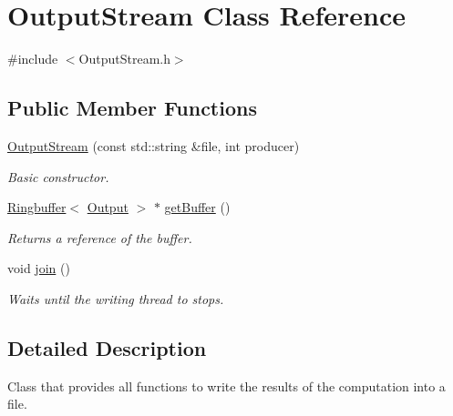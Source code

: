 \hypertarget{classOutputStream}{\section{Output\-Stream Class Reference}
\label{classOutputStream}
}


{\ttfamily \#include $<$Output\-Stream.\-h$>$}

\subsection*{Public Member Functions}
\begin{DoxyCompactItemize}
\item 
\hyperlink{classOutputStream_ab581ff3d5e6cbc31c5f84eea52c298e1}{Output\-Stream} (const std\-::string \&file, int producer)
\begin{DoxyCompactList}\small\item\em Basic constructor. \end{DoxyCompactList}\item 
\hypertarget{classOutputStream_a0e0bc9c5542c5e56e7b331e19c31890d}{\hyperlink{classRingbuffer}{Ringbuffer}$<$ \hyperlink{structfitData}{Output} $>$ $\ast$ \hyperlink{classOutputStream_a0e0bc9c5542c5e56e7b331e19c31890d}{get\-Buffer} ()}\label{classOutputStream_a0e0bc9c5542c5e56e7b331e19c31890d}

\begin{DoxyCompactList}\small\item\em Returns a reference of the buffer. \end{DoxyCompactList}\item 
\hypertarget{classOutputStream_ae8481e9bef46ca1522da5312c32d4bba}{void \hyperlink{classOutputStream_ae8481e9bef46ca1522da5312c32d4bba}{join} ()}\label{classOutputStream_ae8481e9bef46ca1522da5312c32d4bba}

\begin{DoxyCompactList}\small\item\em Waits until the writing thread to stops. \end{DoxyCompactList}\end{DoxyCompactItemize}


\subsection{Detailed Description}
Class that provides all functions to write the results of the computation into a file. 

